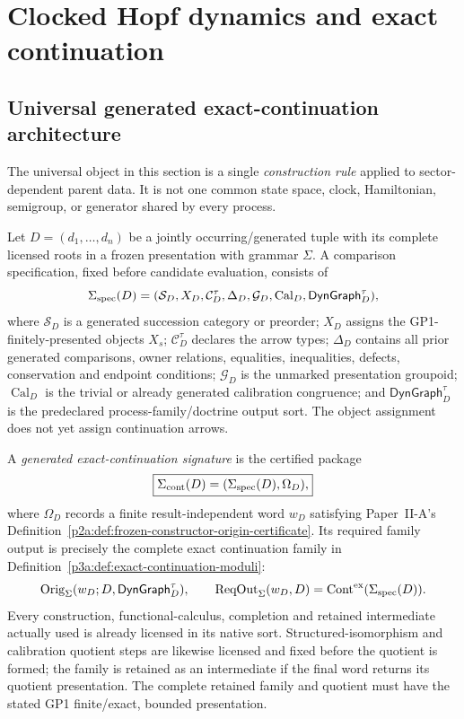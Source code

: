 \documentclass[12pt,a4paper]{article}
\begin{document}
\section{Clocked Hopf dynamics and exact continuation}
\label{paper3a:sec:organized-continuation}
\subsection{Universal generated exact-continuation architecture}
\label{p3a:sec:universal-generated-continuation}

The universal object in this section is a single \emph{construction rule}
applied to sector-dependent parent data.  It is not one common state space,
clock, Hamiltonian, semigroup, or generator shared by every process.

\begin{definition}
\label{p3a:def:generated-exact-continuation-signature}
Let \(D=(d_1,\ldots,d_n)\) be a jointly occurring/generated tuple with
its complete licensed roots in a frozen presentation with grammar \(\Sigma\).
A comparison specification, fixed before candidate evaluation, consists of
\[
 \Sigma_{\rm spec}(D)=
 (\mathcal S_D,X_D,\mathcal C_D^\tau,\Delta_D,
  \mathcal G_D,\operatorname{Cal}_D,\mathsf{DynGraph}_D^\tau),
\]
where \(\mathcal S_D\) is a generated succession category or preorder;
\(X_D\) assigns the GP1-finitely-presented objects \(X_s\);
\(\mathcal C_D^\tau\) declares the arrow types; \(\Delta_D\) contains
all prior generated comparisons, owner relations, equalities, inequalities,
defects, conservation and endpoint conditions; \(\mathcal G_D\) is the
unmarked presentation groupoid; \(\operatorname{Cal}_D\) is the trivial
or already generated calibration congruence; and
\(\mathsf{DynGraph}_D^\tau\) is the predeclared process-family/doctrine
output sort. The object assignment does not yet assign continuation arrows.

A \emph{generated exact-continuation signature} is the certified package
\[
 \boxed{\Sigma_{\rm cont}(D)=(\Sigma_{\rm spec}(D),\Omega_D),}
\]
where \(\Omega_D\) records a finite result-independent word \(w_D\)
satisfying Paper~II-A's
Definition~\ref{p2a:def:frozen-constructor-origin-certificate}. Its required
family output is precisely the complete exact continuation family in
Definition~\ref{p3a:def:exact-continuation-moduli}:
\[
 \operatorname{Orig}_{\Sigma}(w_D;D,\mathsf{DynGraph}_D^\tau),
 \qquad \operatorname{ReqOut}_{\Sigma}(w_D,D)
       =\operatorname{Cont}^{\rm ex}(\Sigma_{\rm spec}(D)).
\]
Every construction, functional-calculus, completion and retained intermediate
actually used is already licensed in its native sort. Structured-isomorphism
and calibration quotient steps are likewise licensed and fixed before the
quotient is formed; the family is retained as an intermediate if the final
word returns its quotient presentation. The complete retained family and
quotient must have the stated GP1 finite/exact, bounded presentation.


\end{definition}
\end{document}
